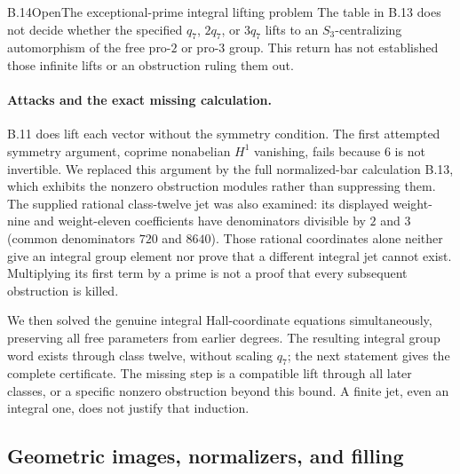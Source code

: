 \begin{statement}{B.14}{Open}{The exceptional-prime integral lifting problem}
The table in B.13 does not decide whether the specified
$q_7$, $2q_7$, or $3q_7$ lifts to an $S_3$-centralizing
automorphism of the free pro-$2$ or pro-$3$ group.
This return has not established those infinite lifts
or an obstruction ruling them out.
\end{statement}
\paragraph{Attacks and the exact missing calculation.}
B.11 does lift each vector without the symmetry condition.
The first attempted symmetry argument, coprime
nonabelian $H^1$ vanishing, fails because $6$ is not
invertible. We replaced this argument by the full
normalized-bar calculation B.13, which exhibits the
nonzero obstruction modules rather than suppressing
them. The supplied rational class-twelve jet was also
examined: its displayed weight-nine and weight-eleven
coefficients have denominators divisible by $2$ and
$3$ (common denominators $720$ and $8640$).
Those rational coordinates alone neither give an
integral group element nor prove that a different
integral jet cannot exist. Multiplying its first
term by a prime is not a proof that every subsequent
obstruction is killed.

We then solved the genuine integral Hall-coordinate
equations simultaneously, preserving all free parameters
from earlier degrees. The resulting integral group word
exists through class twelve, without scaling $q_7$;
the next statement gives the complete certificate.
The missing step is a compatible lift through all later
classes, or a specific nonzero obstruction beyond this
bound. A finite jet, even an integral one, does not
justify that induction.



\subsection{Geometric images, normalizers, and filling}

